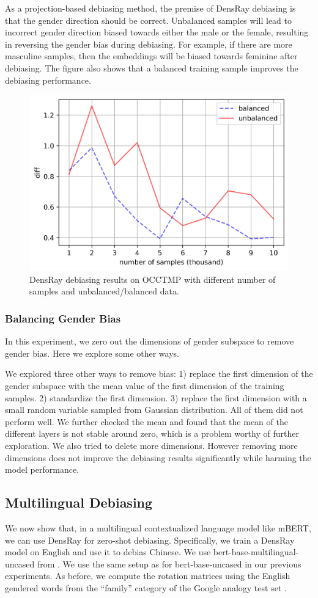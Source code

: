 As a projection-based debiasing method, the premise of DensRay debiasing is that the gender direction should be correct. Unbalanced samples will lead to incorrect gender direction biased towards either the male or the female, resulting in reversing the gender bias during debiasing. For example, if there are more masculine samples, then the embeddings will be biased towards feminine after debiasing. The figure also shows that a balanced training sample improves the debiasing performance.
\begin{figure}[h]
	\centering
	\footnotesize
	\includegraphics[width=0.4\linewidth]{samples}
	\caption{DensRay debiasing results on OCCTMP with different number of samples and unbalanced/balanced data.}
\end{figure}

\subsubsection{Balancing Gender Bias}
In this experiment, we zero out the dimensions of gender subspace to remove gender bias. Here we explore some other ways.

We explored three other ways to remove bias: 1) replace the first dimension of the gender subspace with the mean value of the first dimension of the training samples. 2) standardize the first dimension. 3) replace the first dimension with a small random variable sampled from Gaussian distribution. All of them did not perform well. We further checked the mean and found that the mean of the different layers is not stable around zero, which is a problem worthy of further exploration. We also tried to delete more dimensions. However removing more dimensions does not improve the debiasing results significantly while harming the model performance.


\subsection{Multilingual Debiasing}
We now show that, in a multilingual contextualized language model like mBERT, we can use DensRay for zero-shot debiasing. Specifically, we train a DensRay model on English and use it to debias Chinese.
We use  bert-base-multilingual-uncased from . We use the same setup as for bert-base-uncased in our previous experiments. As before, we compute the rotation matrices using the English gendered words from the ``family'' category of the Google analogy test set .


